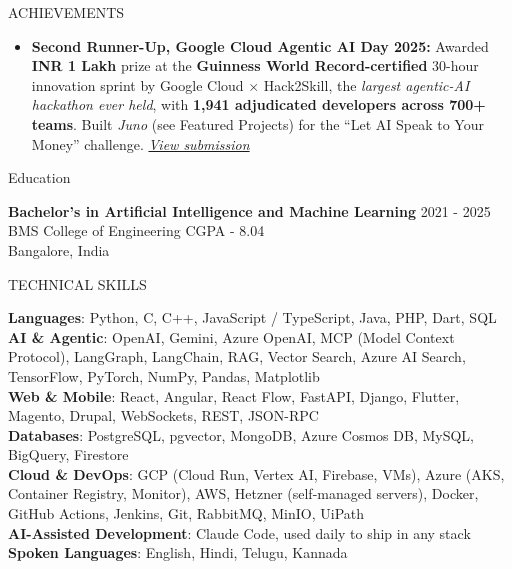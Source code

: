 \documentclass{resume} %
\begin{document}

\begin{rSection}{ACHIEVEMENTS} 
\begin{itemize}
    \item \textbf{Second Runner-Up, Google Cloud Agentic AI Day 2025:} Awarded \textbf{INR 1 Lakh} prize at the \textbf{Guinness World Record-certified} 30-hour innovation sprint by Google Cloud $\times$ Hack2Skill, the \textit{largest agentic-AI hackathon ever held}, with \textbf{1,941 adjudicated developers across 700+ teams}. Built \textit{Juno} (see Featured Projects) for the ``Let AI Speak to Your Money'' challenge. \href{https://drive.google.com/drive/folders/1IPTQvzsI8YVqeHt31QAsgNWxUqD66qVd?usp=sharing}{\textit{View submission}}
\end{itemize}
\end{rSection}


\begin{rSection}{Education}

{\bf Bachelor's in Artificial Intelligence and Machine Learning} \hfill {2021 - 2025} \\
BMS College of Engineering \hfill {CGPA - 8.04} \\
Bangalore, India

\end{rSection}

\begin{rSection}{TECHNICAL SKILLS}

\textbf{Languages}: Python, C, C++, JavaScript / TypeScript, Java, PHP, Dart, SQL \\
\textbf{AI \& Agentic}: OpenAI, Gemini, Azure OpenAI, MCP (Model Context Protocol), LangGraph, LangChain, RAG, Vector Search, Azure AI Search, TensorFlow, PyTorch, NumPy, Pandas, Matplotlib \\
\textbf{Web \& Mobile}: React, Angular, React Flow, FastAPI, Django, Flutter, Magento, Drupal, WebSockets, REST, JSON-RPC \\
\textbf{Databases}: PostgreSQL, pgvector, MongoDB, Azure Cosmos DB, MySQL, BigQuery, Firestore \\
\textbf{Cloud \& DevOps}: GCP (Cloud Run, Vertex AI, Firebase, VMs), Azure (AKS, Container Registry, Monitor), AWS, Hetzner (self-managed servers), Docker, GitHub Actions, Jenkins, Git, RabbitMQ, MinIO, UiPath \\
\textbf{AI-Assisted Development}: Claude Code, used daily to ship in any stack \\
\textbf{Spoken Languages}: English, Hindi, Telugu, Kannada \\

\end{rSection}
\end{document}
